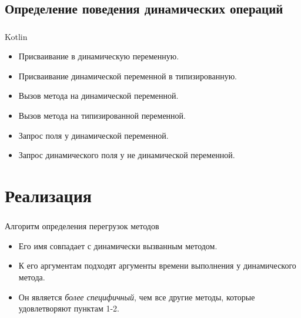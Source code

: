 \documentclass[t]{beamer}  %
\begin{document}
\subsection{Определение поведения динамических операций}
\begin{frame}[fragile]
	\frametitle{\insertsection} 
  	\framesubtitle{\insertsubsection}
    \begin{block}{Kotlin}
\begin{itemize}	
	\item Присваивание в динамическую переменную.
    \item Присваивание динамической переменной в типизированную.
    \item Вызов метода на динамической переменной.
    \item Вызов метода на типизированной переменной.
    \item Запрос поля у динамической переменной.
    \item Запрос динамического поля у не динамической переменной.
\end{itemize}
    \end{block}
\end{frame}


\section{Реализация}
\begin{frame}[fragile]
	\frametitle{\insertsection} 
    \begin{block}{Алгоритм определения перегрузок методов}
\begin{itemize}	
	\item Его имя совпадает с динамически вызванным методом. \label{tbl:better1}
    \item К его аргументам подходят аргументы времени выполнения у динамического метода. \label{tbl:better2}
    \item Он является \textit{более специфичный}, чем все другие методы, которые удовлетворяют пунктам 1-2.
\end{itemize}
    \end{block}
\end{frame}
\end{document}
